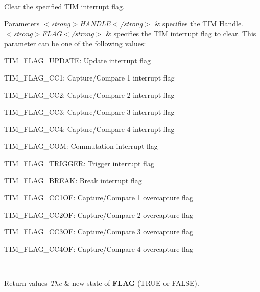 Clear the specified T\+IM interrupt flag. 


\begin{DoxyParams}{Parameters}
{\em $<$strong$>$\+H\+A\+N\+D\+L\+E$<$/strong$>$} & specifies the T\+IM Handle. \\
\hline
{\em $<$strong$>$\+F\+L\+A\+G$<$/strong$>$} & specifies the T\+IM interrupt flag to clear. This parameter can be one of the following values\+: \begin{DoxyItemize}
\item T\+I\+M\+\_\+\+F\+L\+A\+G\+\_\+\+U\+P\+D\+A\+TE\+: Update interrupt flag \item T\+I\+M\+\_\+\+F\+L\+A\+G\+\_\+\+C\+C1\+: Capture/\+Compare 1 interrupt flag \item T\+I\+M\+\_\+\+F\+L\+A\+G\+\_\+\+C\+C2\+: Capture/\+Compare 2 interrupt flag \item T\+I\+M\+\_\+\+F\+L\+A\+G\+\_\+\+C\+C3\+: Capture/\+Compare 3 interrupt flag \item T\+I\+M\+\_\+\+F\+L\+A\+G\+\_\+\+C\+C4\+: Capture/\+Compare 4 interrupt flag \item T\+I\+M\+\_\+\+F\+L\+A\+G\+\_\+\+C\+OM\+: Commutation interrupt flag \item T\+I\+M\+\_\+\+F\+L\+A\+G\+\_\+\+T\+R\+I\+G\+G\+ER\+: Trigger interrupt flag \item T\+I\+M\+\_\+\+F\+L\+A\+G\+\_\+\+B\+R\+E\+AK\+: Break interrupt flag \item T\+I\+M\+\_\+\+F\+L\+A\+G\+\_\+\+C\+C1\+OF\+: Capture/\+Compare 1 overcapture flag \item T\+I\+M\+\_\+\+F\+L\+A\+G\+\_\+\+C\+C2\+OF\+: Capture/\+Compare 2 overcapture flag \item T\+I\+M\+\_\+\+F\+L\+A\+G\+\_\+\+C\+C3\+OF\+: Capture/\+Compare 3 overcapture flag \item T\+I\+M\+\_\+\+F\+L\+A\+G\+\_\+\+C\+C4\+OF\+: Capture/\+Compare 4 overcapture flag \end{DoxyItemize}
\\
\hline
\end{DoxyParams}

\begin{DoxyRetVals}{Return values}
{\em The} & new state of {\bfseries F\+L\+AG} (T\+R\+UE or F\+A\+L\+SE). \\
\hline
\end{DoxyRetVals}
\mbox{\label{group___t_i_m___exported___macros_gaea68155ce77e591e0c2582def061d6f0}} 
